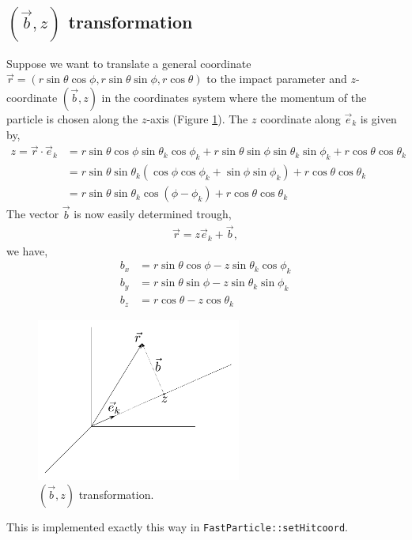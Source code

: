 \subsection{$(\vec{b},z)$ transformation}
Suppose we want to translate a general coordinate $\vec{r} = (r \sin \theta \cos \phi, r \sin \theta \sin \phi,r \cos \theta)$ to the impact parameter and $z$-coordinate $(\vec{b},z)$ in the coordinates system where the momentum of the particle is chosen along the $z$-axis (Figure \ref{fig:bz_transfo}). The $z$ coordinate along $\vec{e}_k$ is given by,
\begin{align*}
	z = \vec{r} \cdot \vec{e}_k &= r \sin \theta \cos \phi \sin \theta_k \cos \phi_k + r \sin \theta \sin \phi \sin \theta_k \sin \phi_k + r \cos \theta \cos \theta_k \\
	&= r \sin \theta \sin \theta_k \left( \cos \phi  \cos \phi_k + \sin \phi \sin \phi_k \right) + r \cos \theta \cos \theta_k \\
	&= r \sin \theta \sin \theta_k \cos( \phi - \phi_k) + r \cos \theta \cos \theta_k
\end{align*}
The vector $\vec{b}$ is now easily determined trough,
\begin{align*}
	\vec{r} = z \vec{e}_k + \vec{b},
\end{align*}
we have,
\begin{align*}
	b_x & = r \sin \theta \cos \phi - z \sin \theta_k \cos \phi_k \\
	b_y & = r \sin \theta \sin \phi - z \sin \theta_k \sin \phi_k \\
	b_z & = r \cos \theta - z \cos \theta_k
\end{align*}
\begin{figure}
\centering
\includegraphics[width=0.6\textwidth]{figs/bz_transfo.pdf}
\caption{$(\vec{b},z)$ transformation.} \label{fig:bz_transfo}
\end{figure}
This is implemented exactly this way in \texttt{FastParticle::setHitcoord}.

